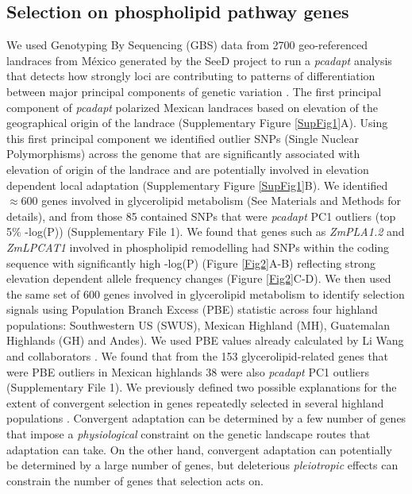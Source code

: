 \documentclass[9pt,twocolumn,twoside,lineno]{BioRxiv}
\begin{document}
\subsection{Selection on phospholipid pathway genes} 
We used Genotyping By Sequencing (GBS) data from 2700 geo-referenced landraces from México generated by the SeeD project \cite{Romero_Navarro2017-cn, Gates2019-xu} to run a \textit{pcadapt} analysis that detects how strongly loci are contributing to patterns of differentiation between major principal components of genetic variation \cite{Luu2017-ws}.
The first principal component of \textit{pcadapt} polarized Mexican landraces based on elevation of the geographical origin of the landrace (Supplementary Figure \ref{SupFig1}A).
Using this first principal component we identified outlier SNPs (Single Nuclear Polymorphisms) across the genome that are significantly associated with elevation of origin of the landrace and are potentially involved in elevation dependent local adaptation (Supplementary Figure \ref{SupFig1}B).
We identified $\approx 600$ genes involved in glycerolipid metabolism (See Materials and Methods for details), and from those 85 contained SNPs that were \textit{pcadapt} PC1 outliers (top 5\% -log(P)) (Supplementary File 1).
We found that genes such as \textit{ZmPLA1.2} and \textit{ZmLPCAT1} involved in phospholipid remodelling had SNPs within the coding sequence with significantly high -log(P) (Figure \ref{Fig2}A-B)  reflecting strong elevation dependent allele frequency changes (Figure \ref{Fig2}C-D). 
We then used the same set of 600 genes involved in glycerolipid metabolism to identify selection signals using Population Branch Excess (PBE) \cite{Pool2017-oa} statistic across four highland populations: Southwestern US (SWUS), Mexican Highland (MH), Guatemalan Highlands (GH) and Andes). 
We used PBE values already calculated by Li Wang  and collaborators \cite{Wang2020-mp}.
We found that from the 153 glycerolipid-related genes that were PBE outliers in Mexican highlands 38 were also \textit{pcadapt} PC1 outliers (Supplementary File 1).
We previously defined two possible explanations for the extent of convergent selection in genes repeatedly selected in several highland populations \cite{Wang2020-mp, yeaman2018}. 
Convergent adaptation can be determined by a few number of genes that impose a \textit{physiological} constraint on the genetic landscape routes that adaptation can take. 
On the other hand, convergent adaptation can potentially be determined by a large number of genes, but deleterious \textit{pleiotropic} effects can constrain the number of genes that selection acts on.  
\end{document}
